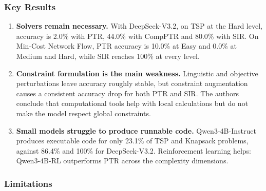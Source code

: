 \documentclass[11pt,a4paper]{article}
\begin{document}
\subsubsection{Key Results}

\begin{enumerate}[leftmargin=1.6em]
\item \textbf{Solvers remain necessary.} With DeepSeek-V3.2, on TSP at the Hard level, accuracy is 2.0\% with PTR, 44.0\% with CompPTR and 80.0\% with SIR. On Min-Cost Network Flow, PTR accuracy is 10.0\% at Easy and 0.0\% at Medium and Hard, while SIR reaches 100\% at every level.\item \textbf{Constraint formulation is the main weakness.} Linguistic and objective perturbations leave accuracy roughly stable, but constraint augmentation causes a consistent accuracy drop for both PTR and SIR. The authors conclude that computational tools help with local calculations but do not make the model respect global constraints.
\item \textbf{Small models struggle to produce runnable code.} Qwen3-4B-Instruct produces executable code for only 23.1\% of TSP and Knapsack problems, against 86.4\% and 100\% for DeepSeek-V3.2. Reinforcement learning helps: Qwen3-4B-RL outperforms PTR across the complexity dimensions.
\end{enumerate}

\subsubsection{Limitations}
\end{document}
